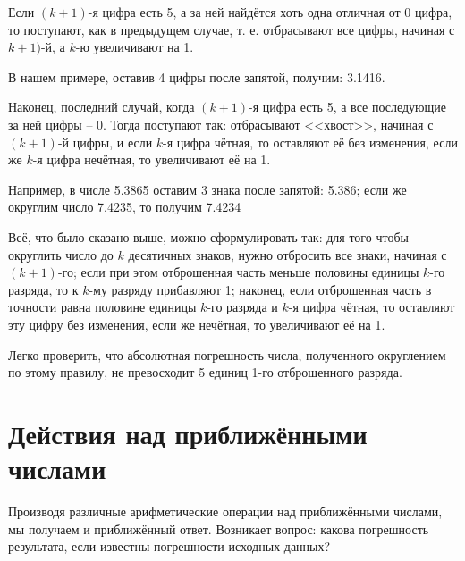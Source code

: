 Если $(k + 1)$-я цифра есть 5, а за ней найдётся хоть одна отличная от 0 цифра,
то поступают, как в предыдущем случае, т. е. отбрасывают все цифры, начиная с
$k + 1)$-й, а $k$-ю увеличивают на 1.

В нашем примере, оставив 4 цифры после запятой, получим: 3.1416.

Наконец, последний случай, когда $(k + 1)$-я цифра есть 5, а все последующие за
ней цифры -- 0. Тогда поступают так: отбрасывают <<хвост>>, начиная с
$(k + 1)$-й цифры, и если $k$-я цифра чётная, то оставляют её без изменения,
если же $k$-я цифра нечётная, то увеличивают её на 1.

Например, в числе 5.3865 оставим 3 знака после запятой: 5.386; если же округлим
число 7.4235, то получим 7.4234

Всё, что было сказано выше, можно сформулировать так: для того чтобы округлить
число до $k$ десятичных знаков, нужно отбросить все знаки, начиная с $(k +
1)$-го; если при этом отброшенная часть меньше половины единицы $k$-го разряда,
то к $k$-му разряду прибавляют 1; наконец, если отброшенная часть в точности
равна половине единицы $k$-го разряда и $k$-я цифра чётная, то оставляют эту
цифру без изменения, если же нечётная, то увеличивают её на 1.

Легко проверить, что абсолютная погрешность числа, полученного округлением по
этому правилу, не превосходит 5 единиц 1-го отброшенного разряда.

\section{Действия над приближёнными числами}
Производя различные арифметические операции над приближёнными числами, мы
получаем и приближённый ответ. Возникает вопрос: какова погрешность результата,
если известны погрешности исходных данных?
